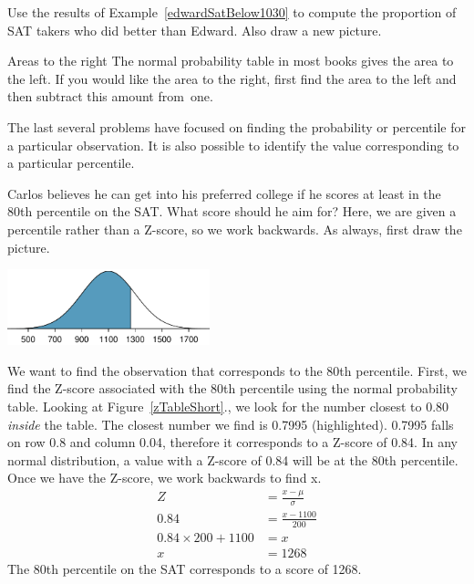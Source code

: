 \begin{exercisewrap}
\begin{nexercise}
Use the results of Example~\ref{edwardSatBelow1030} to compute the proportion of SAT takers who did better than Edward. Also draw a new picture.\footnotemark
\end{nexercise}
\end{exercisewrap}


\begin{onebox}{Areas to the right}
The normal probability table in most books gives the area to the left. If you would like the area to the right, first find the area to the left and then subtract this amount from~one.\end{onebox}

The last several problems have focused on finding the probability or percentile for a particular observation. It is also possible to identify the value corresponding to a particular percentile.

\begin{examplewrap}
\begin{nexample}{Carlos believes he can get into his preferred college if he scores at least in the 80th percentile on the SAT. What score should he aim for?}
Here, we are given a percentile rather than a Z-score, so we work backwards. As always, first draw the picture.
\begin{center}
\includegraphics[height=22mm]{ch_distributions/figures/sat80thPercentile/sat80thPercentile}
\end{center}
We want to find the observation that corresponds to the 80th percentile. First, we find the Z-score associated with the 80th percentile using the normal probability table. Looking at Figure~\ref{zTableShort}., we look for the number closest to 0.80 \emph{inside} the table. The closest number we find is 0.7995 (highlighted). 0.7995 falls on row 0.8 and column 0.04, therefore it corresponds to a Z-score of 0.84. In any normal distribution, a value with a Z-score of 0.84 will be at the 80th percentile. Once we have the Z-score, we work backwards to find x.
\begin{align*}
Z &= \frac{x-\mu}{\sigma} \\
0.84 &= \frac{x-1100}{200} \\
0.84 \times 200+1100 &= x \\
x& = 1268
\end{align*}
The 80th percentile on the SAT corresponds to a score of 1268.
\end{nexample}
\end{examplewrap}


